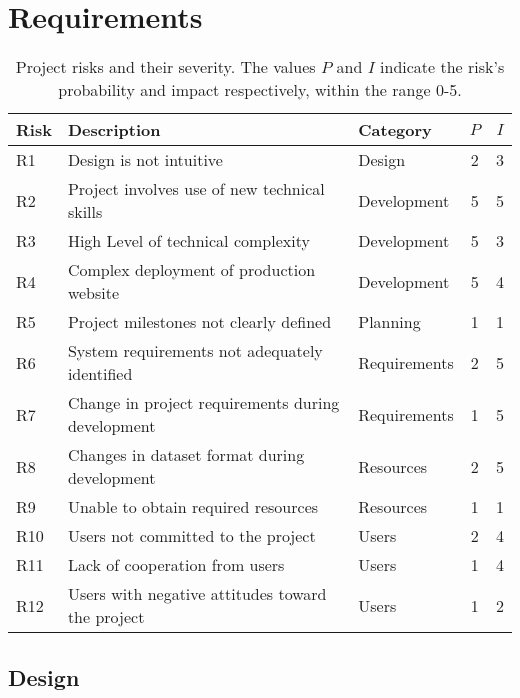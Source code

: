 \chapter{Requirements}\label{chap:requirements}

\begin{table}[H]
\centering
\begin{tabular}{ | p{1.1cm} | l | l | c | c | }
\hline
\textbf{Risk} & \textbf{Description} & \textbf{Category} &
\textbf{$P$} & \textbf{$I$}\\
\hline
R1  & Design is not intuitive                           & Design       & 2 & 3\\
R2  & Project involves use of new technical skills      & Development  & 5 & 5\\
R3  & High Level of technical complexity                & Development  & 5 & 3\\
R4  & Complex deployment of production website          & Development  & 5 & 4\\
R5  & Project milestones not clearly defined            & Planning     & 1 & 1\\
R6  & System requirements not adequately identified     & Requirements & 2 & 5\\
R7  & Change in project requirements during development & Requirements & 1 & 5\\
R8  & Changes in dataset format during development      & Resources    & 2 & 5\\
R9  & Unable to obtain required resources               & Resources    & 1 & 1\\
R10 & Users not committed to the project                & Users        & 2 & 4\\
R11 & Lack of cooperation from users                    & Users        & 1 & 4\\
R12 & Users with negative attitudes toward the project  & Users        & 1 & 2\\
\hline
\end{tabular}
\caption[Project risks and their severity]
        {Project risks and their severity. The values $P$ and $I$
          indicate the risk's probability and impact respectively,
          within the range 0-5.}
\label{tab:risks}
\end{table}

\section{Design}



